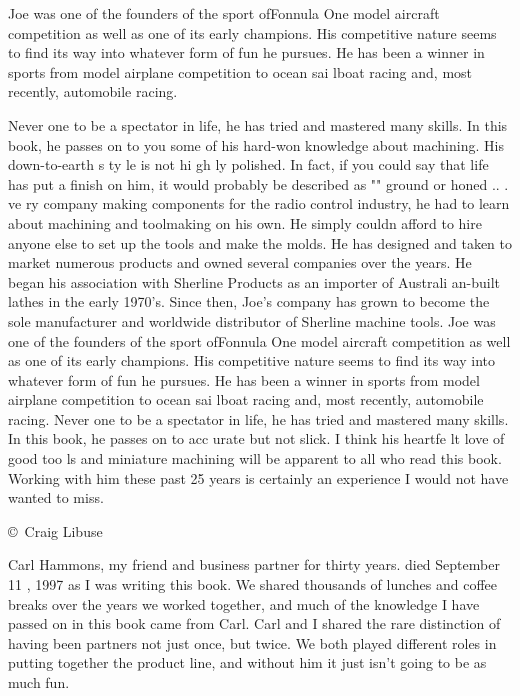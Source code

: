 Joe was one of the founders of the sport ofFonnula One model aircraft
competition as well as one of its early champions. His competitive nature seems
to find its way into whatever form of fun he pursues. He has been a winner in
sports from model airplane competition to ocean sai lboat racing and, most
recently, automobile racing.

Never one to be a spectator in life, he has tried and mastered many skills. In
this book, he passes on to you some of his hard-won knowledge about machining.
His down-to-earth s ty le is not hi gh ly polished. In fact, if you could say
that life has put a finish on him, it would probably be described as "" ground
or honed .. . ve ry company making components for the radio control industry, he
had to learn about machining and toolmaking on his own. He simply couldn afford
to hire anyone else to set up the tools and make the molds. He has designed and
taken to market numerous products and owned several companies over the years. He
began his association with Sherline Products as an importer of Australi an-built
lathes in the early 1970's. Since then, Joe's company has grown to become the
sole manufacturer and worldwide distributor of Sherline machine tools.
Joe was one of the founders of the sport ofFonnula One model aircraft
competition as well as one of its early champions. His competitive nature seems
to find its way into whatever form of fun he pursues. He has been a winner in
sports from model airplane competition to ocean sai lboat racing and, most
recently, automobile racing. Never one to be a spectator in life, he has tried
and mastered many skills. In this book, he passes on to acc urate but not slick.
I think his heartfe lt love of good too ls and miniature machining will be
apparent to all who read this book. Working with him these past 25 years is
certainly an experience I would not have wanted to miss.

\bigskip\copyright\ Craig Libuse



Carl Hammons, my friend and business partner
for thirty years. died September 11 , 1997 as I
was writing this book. We shared thousands of
lunches and coffee breaks over the years we worked
together, and much of the knowledge I have passed
on in this book came from Carl. Carl and I shared
the rare distinction of having been partners not just
once, but twice. We both played different roles in
putting together the product line, and without him
it just isn't going to be as much fun.

